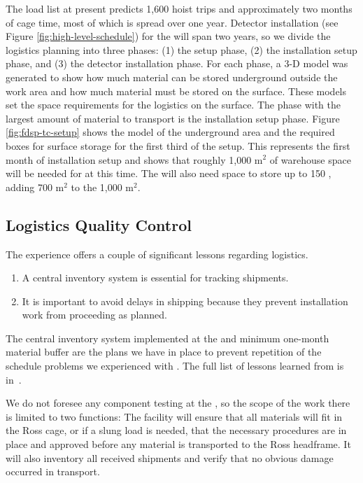 The load list at present predicts 1,600 hoist trips and approximately two  months of cage time, most of which is spread over one year. 
Detector installation (see Figure \ref{fig:high-level-schedule}) for the  will span two years, so we divide the logistics planning into three phases: (1) the  setup phase, (2) the installation setup phase, and (3) the detector installation phase. 
For each phase, a 3-D model was generated to show how much material can be stored underground outside the work area and how much material must be stored on the surface. 
These models set the space requirements for the logistics on the surface. 
The phase with the largest amount of material to transport is the installation setup phase.  
Figure \ref{fig:fdsp-tc-setup} shows the model of the underground area and the required boxes for surface storage for the first third of the setup. 
This represents the first month of installation setup and shows that roughly 1,000 m$^2$ of warehouse space will be needed for  at this time.  The  will also need space to store up to 150 , 
adding 700 m$^2$ to the 1,000 m$^2$. 


\subsection{Logistics Quality Control}
\label{sec:fdsp-tc-log-qaqc}


 
The  experience offers a couple of significant lessons regarding logistics.

\begin{enumerate}
\item A central inventory system is essential for tracking  shipments.
\item It is important to avoid delays in shipping because they prevent installation work from  proceeding as planned. 
\end{enumerate}

The central inventory system  implemented at the   and minimum one-month material buffer are the plans we have in place to prevent repetition of the schedule problems we experienced with .   The full list of lessons learned from  is in~\cite{bib:docdb8255}. 

We do not foresee any component testing at the , so the scope of the  work there is limited to two functions: 
The facility will ensure that all materials will fit in the Ross cage, or if a slung load is needed, that the necessary procedures are in place and approved before any material is transported to the Ross headframe.  
It will also inventory all received shipments and verify that no obvious damage occurred in transport.

